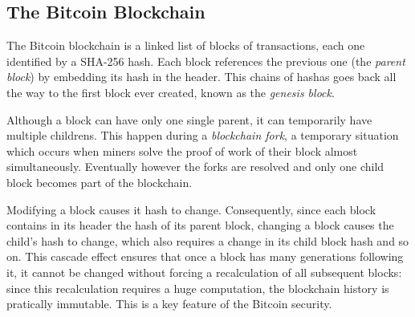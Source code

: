 \subsection{The Bitcoin Blockchain} The Bitcoin blockchain is a linked list of
blocks of transactions, each one  identified by a SHA-256 hash. Each block
references the previous one (the \emph{parent block}) by embedding its hash in
the header. This chains of hashas goes back all the way to the first block ever
created, known as the \emph{genesis block}.

Although a block can have only one single parent, it can temporarily have
multiple childrens. This happen during a \emph{blockchain fork}, a temporary
situation which occurs when miners solve the proof of work of their block almost
simultaneously. Eventually however the forks are resolved and  only one child
block becomes part of the blockchain.

Modifying a block causes it hash to change. Consequently, since each block
contains in its header the hash of its parent block, changing a block causes
the child’s hash to change, which also requires a change in its child block hash
and so on. This cascade effect ensures that once a block has many generations
following it, it cannot be changed without forcing a recalculation of all
subsequent blocks: since this recalculation requires a huge computation, the
blockchain history is pratically immutable. This is a key feature of the Bitcoin
security.

